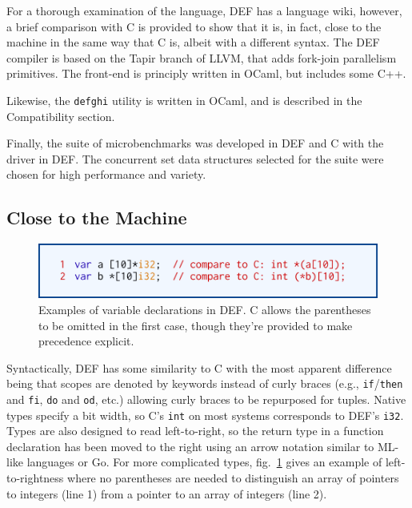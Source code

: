 For a thorough examination of the language, DEF has a language wiki,\cite{DEFWiki} however, a brief comparison with C is provided to show that it is, in fact, close to the machine in the same way that C is, albeit with a different syntax.  The DEF compiler is based on the Tapir branch of LLVM, that adds fork-join parallelism primitives.\cite{TAPIR,LLVM}  The front-end is principly written in OCaml, but includes some C++.

Likewise, the \texttt{defghi} utility is written in OCaml,\cite{DEF} and is described in the Compatibility section.

Finally, the suite of microbenchmarks was developed in DEF and C with the driver in DEF.  The concurrent set data structures selected for the suite were chosen for high performance and variety.

\subsection{Close to the Machine}

\begin{figure}[htbp!]
        \centering
        \includegraphics[scale=0.25]{gfx/types}
        \caption{Examples of variable declarations in DEF.  C allows the parentheses to be omitted in the first case, though they're provided to make precedence explicit.}
        \label{fig:types}
\end{figure}

Syntactically, DEF has some similarity to C with the most apparent difference being that scopes are denoted by keywords instead of curly braces (e.g., \texttt{if}/\texttt{then} and \texttt{fi}, \texttt{do} and \texttt{od}, etc.) allowing curly braces to be repurposed for tuples.  Native types specify a bit width, so C's \texttt{int} on most systems corresponds to DEF's \texttt{i32}.  Types are also designed to read left-to-right, so the return type in a function declaration has been moved to the right using an arrow notation similar to ML-like languages or Go.  For more complicated types, fig.~\ref{fig:types} gives an example of left-to-rightness where no parentheses are needed to distinguish an array of pointers to integers (line 1) from a pointer to an array of integers (line 2).

